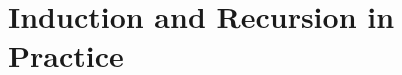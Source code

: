 \section{Induction and Recursion in Practice}
\label{irp}


\addtocounter{theorem}{3}
\begin{theorem} %
	\label{irp:t:ind}
	\TBD
\end{theorem}